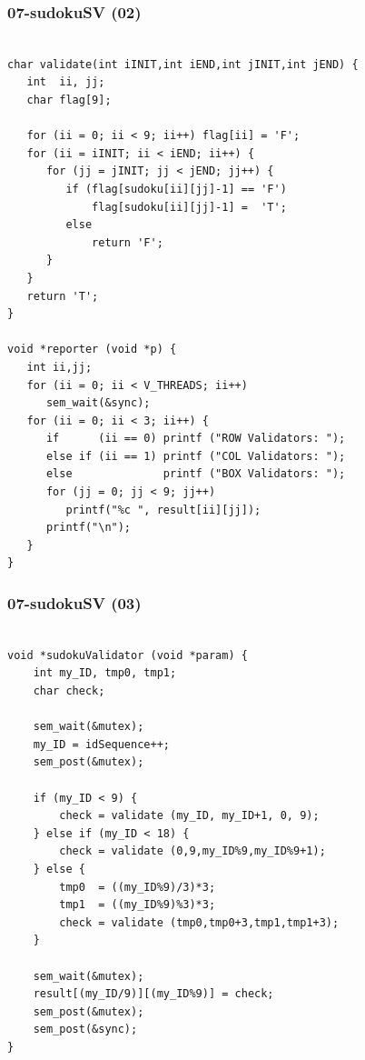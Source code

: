 \documentclass[aspectratio=169, xcolor=table, notheorems, hyperref={pdfpagelabels=false}]{beamer}
\begin{document}
\begin{frame}[fragile]
\frametitle{07-sudokuSV (02)}
\begin{lstlisting}[basicstyle=\ttfamily\tiny]

char validate(int iINIT,int iEND,int jINIT,int jEND) {
   int  ii, jj;
   char flag[9];

   for (ii = 0; ii < 9; ii++) flag[ii] = 'F';
   for (ii = iINIT; ii < iEND; ii++) {
      for (jj = jINIT; jj < jEND; jj++) {
         if (flag[sudoku[ii][jj]-1] == 'F')
             flag[sudoku[ii][jj]-1] =  'T';
         else
             return 'F';
      }
   }
   return 'T';
}

void *reporter (void *p) {
   int ii,jj;
   for (ii = 0; ii < V_THREADS; ii++)
      sem_wait(&sync);
   for (ii = 0; ii < 3; ii++) {
      if      (ii == 0) printf ("ROW Validators: ");
      else if (ii == 1) printf ("COL Validators: ");
      else              printf ("BOX Validators: "); 
      for (jj = 0; jj < 9; jj++)
         printf("%c ", result[ii][jj]);
      printf("\n");
   }
}

\end{lstlisting}
\end{frame}

\begin{frame}[fragile]
\frametitle{07-sudokuSV (03)}
\begin{lstlisting}[basicstyle=\ttfamily\tiny]

void *sudokuValidator (void *param) {       
    int my_ID, tmp0, tmp1;
    char check;

    sem_wait(&mutex);
    my_ID = idSequence++;
    sem_post(&mutex);

    if (my_ID < 9) {
        check = validate (my_ID, my_ID+1, 0, 9);
    } else if (my_ID < 18) {
        check = validate (0,9,my_ID%9,my_ID%9+1);
    } else {
        tmp0  = ((my_ID%9)/3)*3;
        tmp1  = ((my_ID%9)%3)*3;
        check = validate (tmp0,tmp0+3,tmp1,tmp1+3);
    }

    sem_wait(&mutex);
    result[(my_ID/9)][(my_ID%9)] = check;
    sem_post(&mutex);
    sem_post(&sync);
}

\end{lstlisting}
\end{frame}
\end{document}
